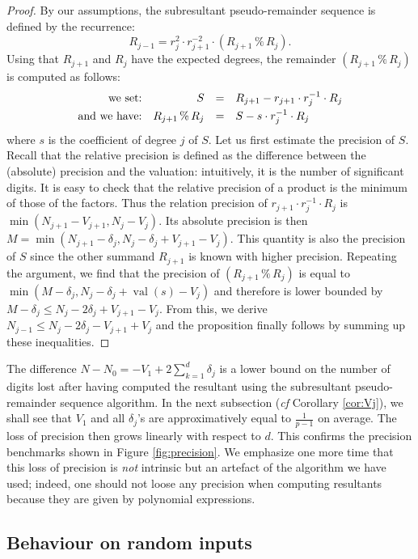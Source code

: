\documentclass{article}
\DeclareMathOperator{\val}{val}
\begin{document}
\begin{proof}
By our assumptions, the subresultant pseudo-remainder sequence 
is defined by the recurrence:
$$R_{j-1} = r_j^2 \cdot r_{j+1}^{-2} \cdot 
(R_{j+1} \,\%\, R_j).$$
Using that $R_{j+1}$ and $R_j$ have the expected degrees, the
remainder $(R_{j+1} \,\%\, R_j)$ is computed as follows:
$$\begin{array}{rrcl}
\text{we set:} & S & = & R_{j+1} - r_{j+1} \cdot r_j^{-1} \cdot R_j \smallskip \\
\text{and we have:} & R_{j+1} \,\%\, R_j & = & S - s \cdot r_j^{-1} \cdot R_j
\end{array}$$
where $s$ is the coefficient of degree $j$ of $S$. Let us first estimate 
the precision of $S$. Recall that the relative precision is defined 
as the difference between the (absolute) precision and the valuation: 
intuitively, it is the number of significant digits. It is easy to check 
that the relative precision of a product is the minimum of those of the 
factors. 
Thus the relation precision of $r_{j+1} \cdot r_j^{-1} \cdot R_j$ is
$\min(N_{j+1} - V_{j+1}, N_j - V_j)$. Its absolute precision is then
$M = \min(N_{j+1} - \delta_j, N_j - \delta_j + V_{j+1} - V_j)$. This
quantity is also the precision of $S$ since the other summand
$R_{j+1}$ is known with higher precision. Repeating the argument, we
find that the precision of $(R_{j+1} \,\%\, R_j)$ is equal to 
$\min(M - \delta_j, N_j - \delta_j + \val(s) - V_j)$ and therefore is 
lower bounded by $M - \delta_j \leq N_j - 2 \delta_j + V_{j+1} - V_j$.
From this, we derive $N_{j-1} \leq N_j - 2 \delta_j - V_{j+1} + V_j$ and
the proposition finally follows by summing up these inequalities.
\end{proof}

The difference 
$N - N_0 = - V_1 + 2 \sum_{k=1}^d \delta_j$
is a lower bound on the number of digits lost after having computed the 
resultant using the subresultant pseudo-remainder sequence algorithm. In 
the next subsection (\emph{cf} Corollary \ref{cor:Vj}), we shall see that 
$V_1$ and all $\delta_j$'s are 
approximatively equal to $\frac 1 {p-1}$ on average. The loss of 
precision then grows linearly with respect to $d$. This confirms the 
precision benchmarks shown in Figure \ref{fig:precision}.
We emphasize one more time that this loss of precision is \emph{not}
intrinsic but an artefact of the algorithm we have used; indeed, one
should not loose any precision when computing resultants because they
are given by polynomial expressions.

\subsection{Behaviour on random inputs}
\label{subsec:proba}
\end{document}
